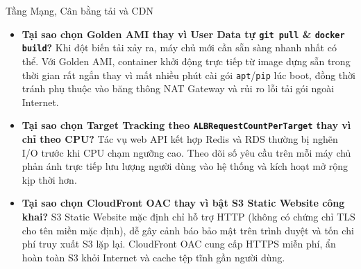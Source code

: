 \begin{clo2box}{Tầng Mạng, Cân bằng tải và CDN}
  \begin{itemize}[leftmargin=1.3em]
    \item \textbf{Tại sao chọn Golden AMI thay vì User Data tự \texttt{git pull} \& \texttt{docker build}?} Khi đột biến tải xảy ra, máy chủ mới cần sẵn sàng nhanh nhất có thể. Với Golden AMI, container khởi động trực tiếp từ image dựng sẵn trong thời gian rất ngắn thay vì mất nhiều phút cài gói \texttt{apt}/\texttt{pip} lúc boot, đồng thời tránh phụ thuộc vào băng thông NAT Gateway và rủi ro lỗi tải gói ngoài Internet.
    \item \textbf{Tại sao chọn Target Tracking theo \texttt{ALBRequestCountPerTarget} thay vì chỉ theo CPU?} Tác vụ web API kết hợp Redis và RDS thường bị nghẽn I/O trước khi CPU chạm ngưỡng cao. Theo dõi số yêu cầu trên mỗi máy chủ phản ánh trực tiếp lưu lượng người dùng vào hệ thống và kích hoạt mở rộng kịp thời hơn.
    \item \textbf{Tại sao chọn CloudFront OAC thay vì bật S3 Static Website công khai?} S3 Static Website mặc định chỉ hỗ trợ HTTP (không có chứng chỉ TLS cho tên miền mặc định), dễ gây cảnh báo bảo mật trên trình duyệt và tốn chi phí truy xuất S3 lặp lại. CloudFront OAC cung cấp HTTPS miễn phí, ẩn hoàn toàn S3 khỏi Internet và cache tệp tĩnh gần người dùng.
  \end{itemize}
\end{clo2box}
